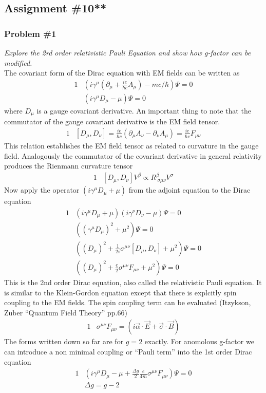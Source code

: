 \documentclass[]{article}
\numberwithin{equation}{subsection}
\begin{document}
\subsection{Assignment \#10**}
\subsubsection*{Problem \#1}
\emph{Explore the 2rd order relativistic Pauli Equation and show how g-factor can be modified.}\\

\noindent The covariant form of the Dirac equation with EM fields can be written as
\begin{alignat}{1}
  \label{j01} &(i\gamma^{\mu}(\partial_{\mu}+\frac{ie}{\hbar c}A_{\mu})-mc/\hbar)\Psi=0\\
  \label{j02} &(i\gamma^{\mu}D_{\mu}-\mu)\Psi=0
\end{alignat}
where $D_{\mu}$ is a gauge covariant derivative. An important thing to note that the commutator of the gauge covariant derivative is the EM field tensor.
\begin{alignat}{1}
  \label{j03} &[D_{\mu},D_{\nu}]=\frac{ie}{\hbar c}(\partial_{\mu}A_{\nu}-\partial_{\nu}A_{\mu})=\frac{ie}{\hbar c}F_{\mu\nu}
\end{alignat}
This relation establishes the EM field tensor as related to curvature in the gauge field. Analogously the commutator of the covariant derivative in general relativity produces the Rienmann curvature tensor
\begin{alignat}{1}
  \label{j04} &[D_{\mu},D_{\nu}]V^{\beta}\propto R^{\beta}_{\ \sigma\mu\nu}V^{\sigma}
\end{alignat}
Now apply the operator $(i\gamma^{\mu}D_{\mu}+\mu)$ from the adjoint equation to the Dirac equation
\begin{alignat}{1}
  \label{j05} &(i\gamma^{\mu}D_{\mu}+\mu)(i\gamma^{\nu}D_{\nu}-\mu)\Psi=0\\
  \label{j06} &((\gamma^{\mu}D_{\mu})^{2}+\mu^{2})\Psi=0\\
  \label{j07} &((D_{\mu})^{2}+\frac{1}{2i}\sigma^{\mu\nu}[D_{\mu},D_{\nu}]+\mu^{2})\Psi=0\\
  \label{j08} &((D_{\mu})^{2}+\frac{e}{2}\sigma^{\mu\nu}F_{\mu\nu}+\mu^{2})\Psi=0
\end{alignat}
This is the 2nd order Dirac equation, also called the relativistic Pauli equation. It is similar to the Klein-Gordon equation except that there is explcitly spin coupling to the EM fields. The spin coupling term can be evaluated (Itzykson, Zuber ``Quantum Field Theory'' pp.66)
\begin{alignat}{1}
  \label{j09} &\sigma^{\mu\nu}F_{\mu\nu}=(i\vec{\alpha}\cdot\vec{E}+\vec{\sigma}\cdot\vec{B})
\end{alignat}
The forms written down so far are for $g=2$ exactly. For anomolous g-factor we can introduce a non minimal coupling or ``Pauli term'' into the 1st order Dirac equation
\begin{alignat}{1}
  \label{j10} &(i\gamma^{\mu}D_{\mu}-\mu+\frac{\Delta g}{2}\frac{e}{4m}\sigma^{\mu\nu}F_{\mu\nu})\Psi=0\\
  \label{j11} &\Delta g = g-2
\end{alignat}
\end{document}
